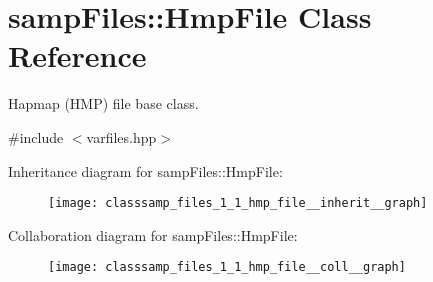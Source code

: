 \hypertarget{classsamp_files_1_1_hmp_file}{}\section{samp\+Files\+:\+:Hmp\+File Class Reference}
\label{classsamp_files_1_1_hmp_file}


Hapmap (H\+MP) file base class.  




{\ttfamily \#include $<$varfiles.\+hpp$>$}



Inheritance diagram for samp\+Files\+:\+:Hmp\+File\+:\nopagebreak
\begin{figure}[H]
\begin{center}
\leavevmode
\texttt{[image: classsamp\_files\_1\_1\_hmp\_file\_\_inherit\_\_graph]}
\end{center}
\end{figure}


Collaboration diagram for samp\+Files\+:\+:Hmp\+File\+:\nopagebreak
\begin{figure}[H]
\begin{center}
\leavevmode
\texttt{[image: classsamp\_files\_1\_1\_hmp\_file\_\_coll\_\_graph]}
\end{center}
\end{figure}

